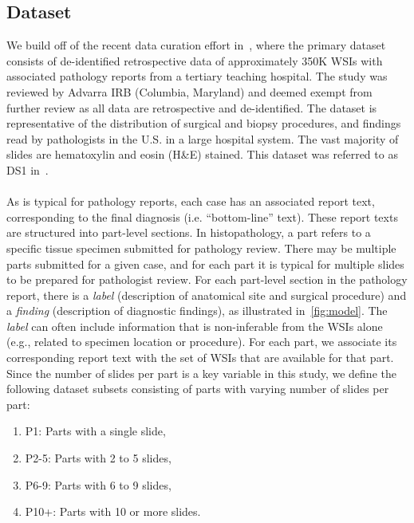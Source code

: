 \documentclass[11pt]{article}
\begin{document}
\subsection{Dataset}
\label{sec:dataset}
We build off of the recent data curation effort in~\citet{ahmed2024pathalign}, where the primary dataset consists of de-identified retrospective data of approximately 350K WSIs with associated pathology reports from a tertiary teaching hospital. The study was reviewed by Advarra IRB (Columbia, Maryland) and deemed exempt from further review as all data are retrospective and de-identified. The dataset is representative of the distribution of surgical and biopsy procedures, and findings read by pathologists in the U.S. in a large hospital system. The vast majority of slides are hematoxylin and eosin (H\&E) stained. This dataset was referred to as \textsc{DS1} in~\citet{ahmed2024pathalign}. \\ \\
As is typical for pathology reports, each case has an associated report text, corresponding to the final diagnosis (i.e. ``bottom-line'' text). These report texts are structured into part-level sections. In histopathology, a part refers to a specific tissue specimen submitted for pathology review. There may be multiple parts submitted for a given case, and for each part it is typical for multiple slides to be prepared for pathologist review. For each part-level section in the pathology report, there is a \emph{label} (description of anatomical site and surgical procedure) and a \emph{finding} (description of diagnostic findings), as illustrated in~\autoref{fig:model}. The \emph{label} can often include information that is non-inferable from the WSIs alone (e.g., related to specimen location or procedure). For each part, we associate its corresponding report text with the set of WSIs that are available for that part. Since the number of slides per part is a key variable in this study, we define the following dataset subsets consisting of parts with varying number of slides per part:
\begin{enumerate}
\setlength{\itemsep}{0pt}
\item \textsc{P1}: Parts with a single slide,
\item \textsc{P2-5}: Parts with 2 to 5 slides,
\item \textsc{P6-9}: Parts with 6 to 9 slides,
\item \textsc{P10+}: Parts with 10 or more slides.
\end{enumerate}
\end{document}
